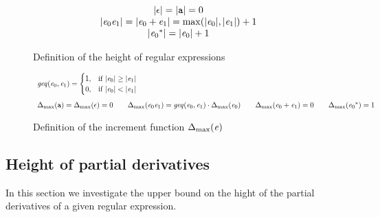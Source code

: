 
\begin{figure}
 $$
  \begin{array}{c}
   {\mid}{\ensuremath{\mathtt {\epsilon}}}{\mid}={\mid}{\mathtt {a}}{\mid}=0                                                              \\
   {\mid}{\mathit {e}_0\mathit {e}_1}{\mid}={\mid}{\mathit {e}_0\mathbin{+}\mathit {e}_1}{\mid}=\max({\mid}{\mathit {e}_0}{\mid},{\mid}{\mathit {e}_1}{\mid})+1 \\
   {\mid}{{\mathit {e}_0}^*}{\mid}={\mid}{\mathit {e}_0}{\mid}+1
  \end{array}
 $$
 \caption{Definition of the height of regular expressions}
 \label{fig:height}
\end{figure}

\begin{figure}
 $$
  \begin{array}{l}
   \mathit{geq}({\mathit {e}_0},{\mathit {e}_1})=
   \begin{cases}
    1, & \text{if } {\mid}{\ensuremath{\mathit {e}}_0}{\mid} \geq {\mid}{\ensuremath{\mathit {e}}_1}{\mid} \\
    0, & \text{if } {\mid}{\ensuremath{\mathit {e}}_0}{\mid} < {\mid}{\mathit {e}_1}{\mid}
   \end{cases} \\[4ex]
   {\Delta_{\max}}({\mathtt {a}})={\Delta_{\max}}({\mathtt {\epsilon}})=0                                      \qquad
   {\Delta_{\max}}({\mathit {e}_0\mathit {e}_1})=\mathit{geq}({\mathit {e}_0},{\mathit {e}_1})\cdot{\Delta_{\max}}({\mathit {e}_0}) \qquad
   {\Delta_{\max}}({\mathit {e}_0\mathbin{+}\mathit {e}_1})=0                                         \qquad
   {\Delta_{\max}}({{\mathit {e}_0}^*})=1
  \end{array}
 $$
 \caption{Definition of the increment function ${\Delta_{\max}}({\mathit {e}})$}
 \label{fig:incFun}
\end{figure}

\subsection{Height of partial derivatives}
In this section we investigate the upper bound on the hight of the partial derivatives of a given regular expression.

